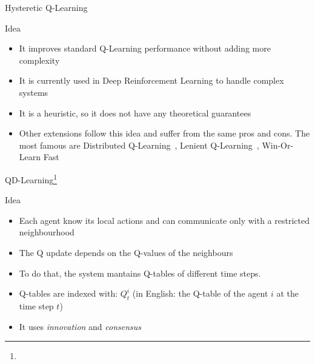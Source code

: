 \documentclass[presentation]{beamer}\mode<presentation>{\usetheme{AMSBolognaFC}}
\begin{document}
\begin{frame}{Hysteretic Q-Learning}
	\begin{exampleblock}{Idea}
		\begin{itemize}{}
			\item[{\color{teal} \faThumbsUp}] It improves standard Q-Learning performance without adding more complexity
			\item[{\color{teal} \faThumbsUp}] It is currently used in Deep Reinforcement Learning to handle complex systems~\parencite{DBLP:conf/icml/OmidshafieiPAHV17}
			\item[{\color{red} \faThumbsDown}] It is a heuristic, so it does not have any theoretical guarantees
			\item Other extensions follow this idea and suffer from the same pros and cons. The most famous are Distributed Q-Learning~\parencite{DBLP:conf/icml/LauerR00}, Lenient Q-Learning~\parencite{DBLP:conf/atal/PanaitSL06}, Win-Or-Learn Fast~\parencite{DBLP:journals/ai/BowlingV02}
		\end{itemize}
	\end{exampleblock}
\end{frame}
\begin{frame}{QD-Learning\footnote[frame]{}}
	\begin{exampleblock}{Idea}
		\begin{itemize}
			\item Each agent know its local actions and can communicate only with a restricted neighbourhood
			\item The Q update depends on the Q-values of the neighbours
			\item To do that, the system mantains Q-tables of different time steps.
			\item Q-tables are indexed with: $Q^i_t$ (in English: the Q-table of the agent $i$ at the time step $t$)
			\item It uses \emph{innovation} and \emph{consensus}
			
		\end{itemize}		
	\end{exampleblock}
\end{frame}
\end{document}
